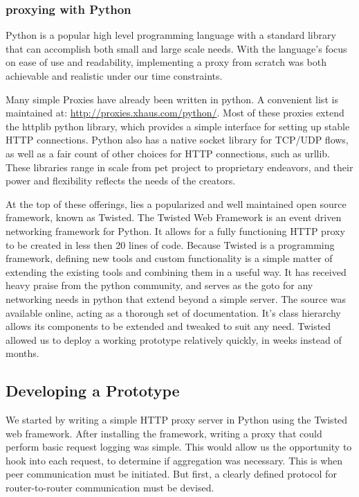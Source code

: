 \documentclass[12pt]{article}
\begin{document}
		\subsubsection{proxying with Python}

			Python is a popular high level programming language with a standard library that can accomplish both small and large scale needs. With the language's focus on ease of use and readability, implementing a proxy from scratch was both achievable and realistic under our time constraints.

			Many simple Proxies have already been written in python. A convenient list is maintained at: \url{http://proxies.xhaus.com/python/}. Most of these proxies extend the httplib python library, which provides a simple interface for setting up stable HTTP connections. Python also has a native socket library for TCP/UDP flows, as well as a fair count of other choices for HTTP connections, such as urllib. These libraries range in scale from pet project to proprietary endeavors, and their power and flexibility reflects the needs of the creators.
			
			At the top of these offerings, lies a popularized and well maintained open source framework, known as Twisted. The Twisted Web Framework is an event driven networking framework for Python. It allows for a fully functioning HTTP proxy to be created in less then 20 lines of code. Because Twisted is a programming framework, defining new tools and custom functionality is a simple matter of extending the existing tools and combining them in a useful way. It has received heavy praise from the python community, and serves as the goto for any networking needs in python that extend beyond a simple server. The source was available online, acting as a thorough set of documentation. It's class hierarchy allows its components to be extended and tweaked to suit any need. Twisted allowed us to deploy a working prototype relatively quickly, in weeks instead of months.

			

	\subsection{Developing a Prototype}

		We started by writing a simple HTTP proxy server in Python using the Twisted web framework. After installing the framework, writing a proxy that could perform basic request logging was simple. This would allow us the opportunity to hook into each request, to determine if aggregation was necessary. This is when peer communication must be initiated. But first, a clearly defined protocol for router-to-router communication must be devised.
\end{document}
